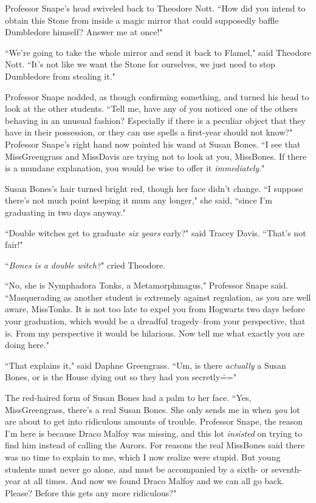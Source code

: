 Professor Snape's head swiveled back to Theodore Nott. ``How did you intend to obtain this Stone from inside a magic mirror that could supposedly baffle Dumbledore himself? Answer me at once!"

``We're going to take the whole mirror and send it back to Flamel," said Theodore Nott. ``It's not like we want the Stone for ourselves, we just need to stop Dumbledore from stealing it."

Professor Snape nodded, as though confirming something, and turned his head to look at the other students. ``Tell me, have any of you noticed one of the others behaving in an unusual fashion? Especially if there is a peculiar object that they have in their possession, or they can use spells a first-year should not know?" Professor Snape's right hand now pointed his wand at Susan Bones. ``I see that Miss\?Greengrass and Miss\?Davis are trying not to look at you, Miss\?Bones. If there is a mundane explanation, you would be wise to offer it \emph{immediately}."

Susan Bones's hair turned bright red, though her face didn't change. ``I suppose there's not much point keeping it mum any longer," she said, ``since I'm graduating in two days anyway."

``Double witches get to graduate \emph{six years} early?" said Tracey Davis. ``That's not fair!"

``\emph{Bones is a double witch?}" cried Theodore.

``No, she is Nymphadora Tonks, a Metamorphmagus," Professor Snape said. ``Masquerading as another student is extremely against regulation, as you are well aware, Miss\?Tonks. It is not too late to expel you from Hogwarts two days before your graduation, which would be a dreadful tragedy\---from your perspective, that is. From my perspective it would be hilarious. Now tell me what exactly you are doing here."

``That explains it," said Daphne Greengrass. ``Um, is there \emph{actually} a Susan Bones, or is the House dying out so they had you secretly\==="

The red-haired form of Susan Bones had a palm to her face. ``Yes, Miss\?Greengrass, there's a real Susan Bones. She only sends me in when \emph{you} lot are about to get into ridiculous amounts of trouble. Professor Snape, the reason I'm here is because Draco Malfoy was missing, and this lot \emph{insisted} on trying to find him instead of calling the Aurors. For reasons the real Miss\?Bones said there was no time to explain to me, which I now realize were stupid. But young students must never go alone, and must be accompanied by a sixth- or seventh-year at all times. And now we found Draco Malfoy and we can all go back. Please? Before this gets any more ridiculous?"

